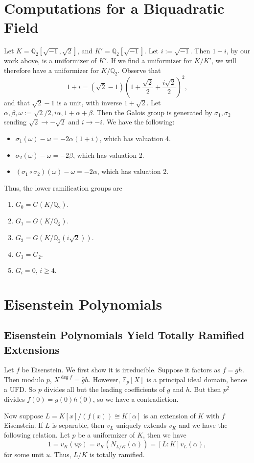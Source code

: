 \documentclass[12pt]{amsart}
\theoremstyle{named}
\newcommand{\Q}{\mathbb{Q}}
\begin{document}
\section{Computations for a Biquadratic Field}
Let $K = \Q_2[\sqrt{-1}, \sqrt{2}]$, and $K' = \Q_2[\sqrt{-1}]$. Let $i := \sqrt{-1}$. Then $1 + i$,
by our work above, is a uniformizer of $K'$. If we find a uniformizer for $K/K'$, we will therefore
have a uniformizer for $K/\Q_2$. Observe that
\[ 1 + i = (\sqrt{2} - 1)\left(1 + \dfrac{\sqrt{2}}{2} + \dfrac{i \sqrt{2}}{2}\right)^2, \] and that
$\sqrt{2} - 1$ is a unit, with inverse $1 + \sqrt{2}$. Let
$\alpha, \beta, \omega := \sqrt{2}/2, i \alpha, 1 + \alpha + \beta$. Then the Galois group is
generated by $\sigma_1, \sigma_2$ sending $\sqrt{2} \rightarrow -\sqrt{2}$ and $i \rightarrow -i$. 
We have the following:
\begin{itemize}
\item $\sigma_1(\omega) - \omega = - 2 \alpha (1 + i)$, which has valuation 4.
\item $\sigma_2(\omega) - \omega = - 2 \beta$, which has valuation 2.
\item $(\sigma_1 \circ \sigma_2)(\omega) - \omega = -2\alpha$, which has valuation 2.
\end{itemize}
Thus, the lower ramification groups are
\begin{enumerate}
\item $G_0 = G(K/\Q_2).$
\item $G_1 = G(K/\Q_2).$
\item $G_2 = G(K/\Q_2(i\sqrt{2})).$
\item $G_3 = G_2.$
\item $G_i = 0$, $i \geq 4$.
\end{enumerate}
\section{Eisenstein Polynomials}
\subsection{Eisenstein Polynomials Yield Totally Ramified Extensions}
Let $f$ be Eisenstein. We
first show it is irreducible. Suppose it factors as $f = gh$. Then modulo $p$,
$X^{\deg f} = \overline{g} \overline{h}$. However, $\mathbb{F}_p[X]$ is a principal ideal domain, hence a
UFD. So $p$ divides all but the leading coefficients of $g$ and $h$. But then $p^2$ divides
$f(0) = g(0) h(0)$, so we have a contradiction.

Now suppose $L = K[x]/(f(x)) \cong K[\alpha]$ is an extension of $K$ with $f$ Eisenstein. If $L$ is
separable, then $v_L$ uniquely extends $v_K$ and we have the following relation. Let $p$ be
a uniformizer of $K$, then we have \[1 = v_K(up) = v_K(N_{L/K}(\alpha)) = [L : K] v_L(\alpha),\] for 
some unit $u$. Thus, $L/K$ is totally ramified.
\end{document}
